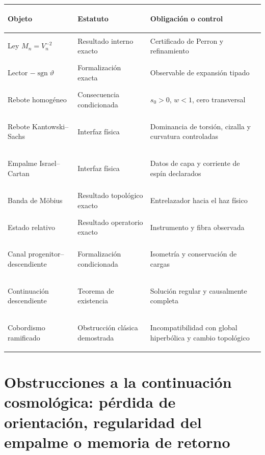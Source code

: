 \begin{center}
\small
\begin{tabularx}{\textwidth}{>{\bfseries\raggedright\arraybackslash}p{31mm}YY}
\toprule
Objeto & Estatuto & Obligaci\'on o control\\
\midrule
Ley \(M_n=V_n^{-2}\) & Resultado interno exacto & Certificado de Perron y refinamiento\\
Lector \(-\operatorname{sgn}\vartheta\) & Formalizaci\'on exacta & Observable de expansi\'on tipado\\
Rebote homog\'eneo & Consecuencia condicionada & \(s_0>0\), \(w<1\), cero transversal\\
Rebote Kantowski--Sachs & Interfaz f\'isica & Dominancia de torsi\'on, cizalla y curvatura controladas\\
Empalme Israel--Cartan & Interfaz f\'isica & Datos de capa y corriente de esp\'in declarados\\
Banda de M\"obius & Resultado topol\'ogico exacto & Entrelazador hacia el haz f\'isico\\
Estado relativo & Resultado operatorio exacto & Instrumento y fibra observada\\
Canal progenitor--descendiente & Formalizaci\'on condicionada & Isometr\'ia y conservaci\'on de cargas\\
Continuaci\'on descendiente & Teorema de existencia & Soluci\'on regular y causalmente completa\\
Cobordismo ramificado & Obstrucci\'on clásica demostrada & Incompatibilidad con global hiperbólica y cambio topol\'ogico\\
\bottomrule
\end{tabularx}
\end{center}

\section{Obstrucciones a la continuación cosmológica: pérdida de orientación, regularidad del empalme o memoria de retorno}

